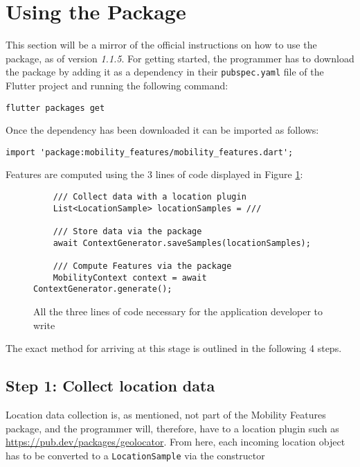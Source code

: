 \section{Using the Package}
This section will be a mirror of the official instructions on how to use the package, as of version \textit{1.1.5}. For getting started, the programmer has to download the package by adding it as a dependency in their \verb|pubspec.yaml| file of the Flutter project and running the following command:

\begin{verbatim}
flutter packages get
\end{verbatim}

Once the dependency has been downloaded it can be imported as follows:

\begin{verbatim}
import 'package:mobility_features/mobility_features.dart';
\end{verbatim}

Features are computed using the 3 lines of code displayed in Figure \ref{fig:code-example-intro}:

\begin{figure}[h]
    \centering
    \begin{verbatim}
    /// Collect data with a location plugin
    List<LocationSample> locationSamples = ///

    /// Store data via the package
    await ContextGenerator.saveSamples(locationSamples);
    
    /// Compute Features via the package
    MobilityContext context = await ContextGenerator.generate();
    \end{verbatim}
    \caption{All the three lines of code necessary for the application developer to write}
    \label{fig:code-example-intro}
\end{figure}

The exact method for arriving at this stage is outlined in the following 4 steps.

\subsection*{Step 1: Collect location data}
Location data collection is, as mentioned, not part of the Mobility Features package, and the programmer will, therefore, have to a location plugin such as \url{https://pub.dev/packages/geolocator}. From here, each incoming location object has to be converted to a \verb|LocationSample| via the constructor

